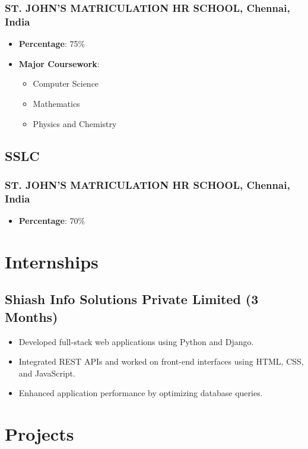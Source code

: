 \documentclass[11pt]{article}
\begin{document}
\subsubsection{ST. JOHN'S MATRICULATION HR SCHOOL, Chennai, India}
\begin{itemize}
    \item \textbf{Percentage}: 75\%
    \item \textbf{Major Coursework}: 
    \begin{itemize}
        \item Computer Science
        \item Mathematics
        \item Physics and Chemistry
    \end{itemize}
\end{itemize}

\subsection{SSLC \hfill {}}  
\subsubsection{ST. JOHN'S MATRICULATION HR SCHOOL, Chennai, India}
\begin{itemize}
    \item \textbf{Percentage}: 70\%
\end{itemize}

\section{Internships}
\subsection{Shiash Info Solutions Private Limited (3 Months)} 
\begin{itemize}
    \item Developed full-stack web applications using Python and Django.
    \item Integrated REST APIs and worked on front-end interfaces using HTML, CSS, and JavaScript.
    \item Enhanced application performance by optimizing database queries.
\end{itemize}

\section{Projects}
\end{document}
